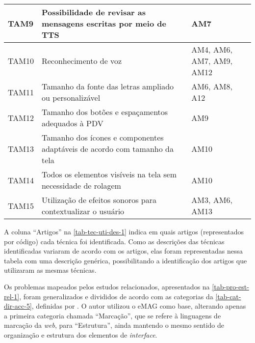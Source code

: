 \begin{table}[htb]
\begin{center}
\begin{tabular}{p{1.2cm}|p{9.2cm}|p{4.1cm}}
            \hline
            TAM9            & Possibilidade de revisar as mensagens escritas por meio de TTS                                     & AM7                                                                  \\
            \hline
            TAM10           & Reconhecimento de voz                                                                              & AM4, AM6, AM7, AM9, AM12                                             \\
            \hline
            TAM11           & Tamanho da fonte das letras ampliado ou personalizável                                             & AM6, AM8, A12                                                        \\
            \hline
            TAM12           & Tamanho dos botões e espaçamentos adequados à PDV                                                  & AM9                                                                  \\
            \hline
            TAM13           & Tamanho dos ícones e componentes adaptáveis de acordo com tamanho da tela                          & AM10                                                                 \\
            \hline
            TAM14           & Todos os elementos visíveis na tela sem necessidade de rolagem                                     & AM10                                                                 \\
            \hline
            TAM15           & Utilização de efeitos sonoros para contextualizar o usuário                                        & AM3, AM6, AM13                                                       \\
        \end{tabular}
    \end{center}
\end{table}

A coluna ``Artigos'' na \autoref{tab-tec-uti-des-1} indica em quais artigos (representados por código) cada técnica foi identificada.
Como as descrições das técnicas identificadas variaram de acordo com os artigos, elas foram representadas nessa tabela
com uma descrição genérica, possibilitando a identificação dos artigos que utilizaram as mesmas técnicas.

\newpage

Os problemas mapeados pelos estudos relacionados, apresentados na \autoref{tab-pro-est-rel-1}, foram generalizados e divididos de acordo com as categorias
da \autoref{tab-cat-dir-acc-5}, definidas por . O autor utilizou o eMAG como base,
alterando apenas a primeira categoria chamada ``Marcação'', que se refere à linguagens de marcação da \emph{web},
para ``Estrutura'', ainda mantendo o mesmo sentido de organização e estrutura dos elementos de \emph{interface}.

